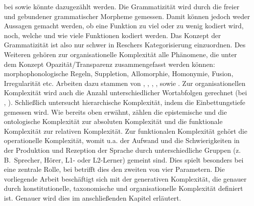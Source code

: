 bei \citet{MaitzNémeth2014} sowie \citet{SzmrecsanyiKortmann2009} könnte dazugezählt werden. Die Grammatizität wird durch die  freier und gebundener grammatischer Morpheme gemessen. Damit können jedoch weder Aussagen gemacht werden, ob eine Funktion zu viel oder zu wenig kodiert wird, noch, welche und wie viele Funktionen kodiert werden. Das Konzept der Grammatizität ist also nur schwer in Reschers Kategorisierung einzuordnen. Des Weiteren gehören zur organisationelle Komplexität alle Phänomene, die unter dem Konzept Opazität/Transparenz zusammengefasst werden können: morphophonologische Regeln, Suppletion, Allomorphie, Homonymie, Fusion, Irregularität etc. Arbeiten dazu stammen von \citet{Braunmüller1984}, \citet{McWhorter2001}, \citet{Kusters2003}, \citet{SzmrecsanyiKortmann2009}, \citet{MaitzNémeth2014} sowie \citet{Nichols2016}. Zur organisationellen Komplexität wird auch die Anzahl unterschiedlicher Wortabfolgen gerechnet (bei \citealt{McWhorter2001}, \citealt{Nichols2016}). Schließlich untersucht \citet{Sampson2001} hierarchische Komplexität, indem die Einbettungstiefe gemessen wird. Wie bereits oben erwähnt, zählen die epistemische und die ontologische Komplexität zur absoluten Komplexität und die funktionale Komplexität zur relativen Komplexität. Zur funktionalen Komplexität gehört die operationelle Komplexität, womit u.a. der Aufwand und die Schwierigkeiten in der Produktion und Rezeption der Sprache durch unterschiedliche Gruppen (z.\,B.\ Sprecher, Hörer, L1- oder L2-Ler\-ner) gemeint sind. Dies spielt besonders bei \citet{Kusters2003} eine zentrale Rolle, bei \citet{SzmrecsanyiKortmann2009} betrifft dies den zweiten von vier Parametern. Die vorliegende Arbeit beschäftigt sich mit der generativen Komplexität, die genauer durch konstitutionelle, taxonomische und organisationelle Komplexität definiert ist. Genauer wird dies im anschließenden Kapitel erläutert.


